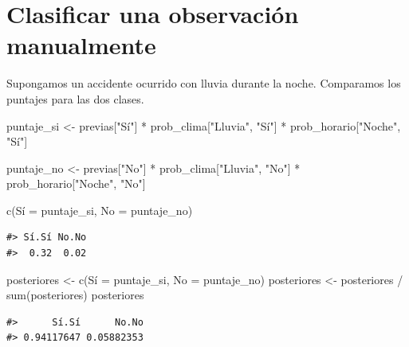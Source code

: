 \documentclass[
  spanish,
  10.5pt,
  letterpaper,
  openany,
  headings=big]{scrbook}
\newenvironment{Shaded}{}{}
\newcommand{\AttributeTok}[1]{\textcolor[rgb]{0.84,0.23,0.29}{#1}}
\newcommand{\FunctionTok}[1]{\textcolor[rgb]{0.44,0.26,0.76}{#1}}
\newcommand{\NormalTok}[1]{\textcolor[rgb]{0.14,0.16,0.18}{#1}}
\newcommand{\OtherTok}[1]{\textcolor[rgb]{0.44,0.26,0.76}{#1}}
\newcommand{\SpecialCharTok}[1]{\textcolor[rgb]{0.00,0.36,0.77}{#1}}
\newcommand{\StringTok}[1]{\textcolor[rgb]{0.01,0.18,0.38}{#1}}
\begin{document}
\section{Clasificar una observación
manualmente}\label{clasificar-una-observaciuxf3n-manualmente}

Supongamos un accidente ocurrido con lluvia durante la noche. Comparamos
los puntajes para las dos clases.

\begin{Shaded}
\begin{Highlighting}[]
\NormalTok{puntaje\_si }\OtherTok{\textless{}{-}}
\NormalTok{  previas[}\StringTok{"Sí"}\NormalTok{] }\SpecialCharTok{*}
\NormalTok{  prob\_clima[}\StringTok{"Lluvia"}\NormalTok{, }\StringTok{"Sí"}\NormalTok{] }\SpecialCharTok{*}
\NormalTok{  prob\_horario[}\StringTok{"Noche"}\NormalTok{, }\StringTok{"Sí"}\NormalTok{]}

\NormalTok{puntaje\_no }\OtherTok{\textless{}{-}}
\NormalTok{  previas[}\StringTok{"No"}\NormalTok{] }\SpecialCharTok{*}
\NormalTok{  prob\_clima[}\StringTok{"Lluvia"}\NormalTok{, }\StringTok{"No"}\NormalTok{] }\SpecialCharTok{*}
\NormalTok{  prob\_horario[}\StringTok{"Noche"}\NormalTok{, }\StringTok{"No"}\NormalTok{]}

\FunctionTok{c}\NormalTok{(Sí }\OtherTok{=}\NormalTok{ puntaje\_si, }\AttributeTok{No =}\NormalTok{ puntaje\_no)}
\end{Highlighting}
\end{Shaded}

\begin{verbatim}
#> Sí.Sí No.No 
#>  0.32  0.02
\end{verbatim}

\begin{Shaded}
\begin{Highlighting}[]
\NormalTok{posteriores }\OtherTok{\textless{}{-}} \FunctionTok{c}\NormalTok{(Sí }\OtherTok{=}\NormalTok{ puntaje\_si, }\AttributeTok{No =}\NormalTok{ puntaje\_no)}
\NormalTok{posteriores }\OtherTok{\textless{}{-}}\NormalTok{ posteriores }\SpecialCharTok{/} \FunctionTok{sum}\NormalTok{(posteriores)}
\NormalTok{posteriores}
\end{Highlighting}
\end{Shaded}

\begin{verbatim}
#>      Sí.Sí      No.No 
#> 0.94117647 0.05882353
\end{verbatim}
\end{document}
